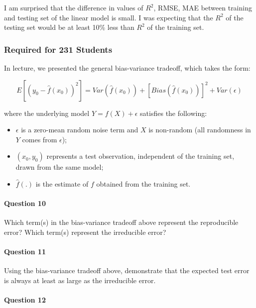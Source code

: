 \documentclass[
]{article}
\providecommand{\tightlist}{%
  \setlength{\itemsep}{0pt}\setlength{\parskip}{0pt}}
\begin{document}
I am surprised that the difference in values of \(R^2\), RMSE, MAE
between training and testing set of the linear model is small. I was
expecting that the \(R^2\) of the testing set would be at least 10\%
less than \(R^2\) of the training set.

\hypertarget{required-for-231-students}{%
\subsubsection{Required for 231
Students}\label{required-for-231-students}}

In lecture, we presented the general bias-variance tradeoff, which takes
the form:

\[
E[(y_0 - \hat{f}(x_0))^2]=Var(\hat{f}(x_0))+[Bias(\hat{f}(x_0))]^2+Var(\epsilon)
\]

where the underlying model \(Y=f(X)+\epsilon\) satisfies the following:

\begin{itemize}
\tightlist
\item
  \(\epsilon\) is a zero-mean random noise term and \(X\) is non-random
  (all randomness in \(Y\) comes from \(\epsilon\));
\item
  \((x_0, y_0)\) represents a test observation, independent of the
  training set, drawn from the same model;
\item
  \(\hat{f}(.)\) is the estimate of \(f\) obtained from the training
  set.
\end{itemize}

\hypertarget{question-10}{%
\paragraph{Question 10}\label{question-10}}

Which term(s) in the bias-variance tradeoff above represent the
reproducible error? Which term(s) represent the irreducible error?

\hypertarget{question-11}{%
\paragraph{Question 11}\label{question-11}}

Using the bias-variance tradeoff above, demonstrate that the expected
test error is always at least as large as the irreducible error.

\hypertarget{question-12}{%
\paragraph{Question 12}\label{question-12}}
\end{document}
